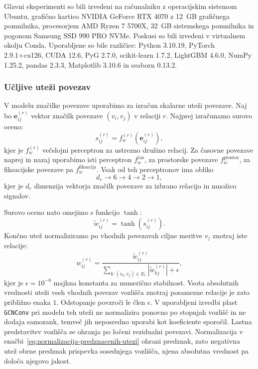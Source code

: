 Glavni eksperimenti so bili izvedeni na računalniku z operacijskim sistemom
Ubuntu, grafično kartico NVIDIA GeForce RTX 4070 z 12~GB grafičnega pomnilnika,
procesorjem AMD Ryzen 7 5700X, 32~GB sistemskega pomnilnika in pogonom Samsung
SSD 990 PRO NVMe.
Poskusi so bili izvedeni v virtualnem okolju Conda.
Uporabljene so bile različice: Python 3.10.19, PyTorch 2.9.1+cu126, CUDA 12.6, PyG 2.7.0, scikit-learn 1.7.2, LightGBM 4.6.0, NumPy 1.25.2, pandas 2.3.3, Matplotlib 3.10.6 in seaborn 0.13.2.

\subsubsection*{Učljive uteži povezav}
\label{app:naucene-utezi-povezav}

V modelu  značilke povezave uporabimo za izračun skalarne uteži povezave.
Naj bo $\mathbf{e}_{ij}^{(r)}$ vektor značilk povezave $(v_i, v_j)$ v relaciji $r$.
Najprej izračunamo surovo oceno:
\begin{equation}
    s_{ij}^{(r)} =
    f_w^{(r)}
    \left(
    \mathbf{e}_{ij}^{(r)}
    \right),
\end{equation}
kjer je $f_w^{(r)}$ večslojni perceptron za ustrezno družino relacij.
Za časovne povezave naprej in nazaj uporabimo isti perceptron $f_w^{\text{čas}}$, za prostorske povezave $f_w^{\text{prostor}}$, za fiksacijske povezave pa $f_w^{\text{fiksacija}}$.
Vsak od teh perceptronov ima obliko
\begin{equation}
    d_e \rightarrow 6 \rightarrow 4 \rightarrow 2 \rightarrow 1,
\end{equation}
kjer je $d_e$ dimenzija vektorja značilk povezave za izbrano relacijo in množico signalov.

Surovo oceno nato omejimo s funkcijo $\tanh$:
\begin{equation}
    \tilde{w}_{ij}^{(r)} =
    \tanh
    \left(
    s_{ij}^{(r)}
    \right).
\end{equation}
Končno utež normaliziramo po vhodnih povezavah ciljne meritve $v_j$ znotraj iste relacije:
\begin{equation}
    w_{ij}^{(r)} =
    \frac{
        \tilde{w}_{ij}^{(r)}
    }{
        \sum_{k : (v_k, v_j) \in E_r}
        \left|
        \tilde{w}_{kj}^{(r)}
        \right|
        + \epsilon
    },
    \label{eq:normalizacija-predznacenih-utezi}
\end{equation}
kjer je $\epsilon=10^{-8}$ majhna konstanta za numerično stabilnost.
Vsota absolutnih vrednosti uteži vseh vhodnih povezav vozlišča znotraj posamezne relacije je zato približno enaka $1$. Odstopanje povzroči le člen $\epsilon$.
V uporabljeni izvedbi plast \texttt{GCNConv} pri modelu  teh uteži ne normalizira ponovno po stopnjah vozlišč in ne dodaja samozank, temveč jih neposredno uporabi kot koeficiente sporočil.
Lastna predstavitev vozlišča se ohranja po ločeni rezidualni povezavi.
Normalizacija v enačbi~\eqref{eq:normalizacija-predznacenih-utezi} ohrani predznak, zato negativna utež obrne predznak prispevka sosednjega vozlišča, njena absolutna vrednost pa določa njegovo jakost.

